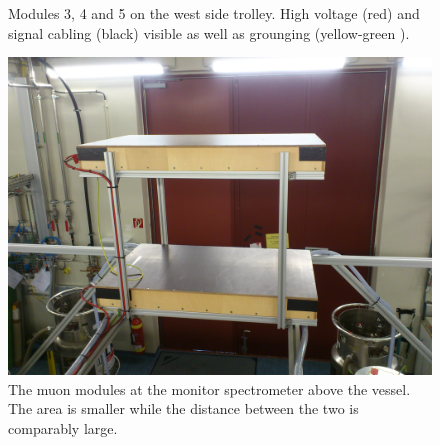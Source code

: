 \begin{figure}
\begin{minipage}{0.49\textwidth}
		\caption[East side modules]{Modules 3, 4 and 5 on the west side trolley. High voltage (red) and signal cabling (black) visible as well as grounging (yellow-green
		).}
		\label{fig:westSide}
  	\end{minipage}
	
  \end{figure}

  
  \begin{figure}
	\begin{minipage}{0.69\textwidth}
		\centering
		\includegraphics[width = \textwidth]{graphics/muonModules/monSpec/muonModules.jpg}
		\caption[Monitor spectrometer modules]{The muon modules at the monitor spectrometer above the vessel. The area is smaller while the distance between the two is comparably large. }
		\label{fig:monSpecPanels}
	\end{minipage}
	\begin{minipage}{0.3\textwidth}

\end{minipage}
\end{figure}
